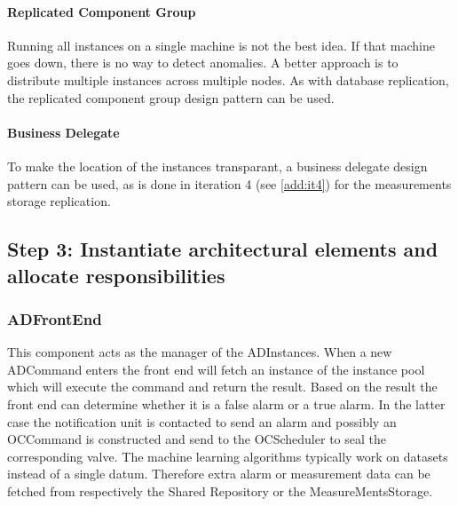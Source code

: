 \paragraph{Replicated Component Group}

\npar Running all instances on a single machine is not the best idea. If that
machine goes down, there is no way to detect anomalies. A better approach is to
distribute multiple instances across multiple nodes. As with database
replication, the replicated component group design pattern
\citep[see][p.~326]{Buschmann:07} can be used.

\paragraph{Business Delegate}

\npar To make the location of the instances transparant, a business delegate
design pattern \citep[see][p.~292]{Buschmann:07} can be used, as is done in
iteration 4 (see \ref{add:it4}) for the measurements storage replication.

\subsection{Step 3: Instantiate architectural elements and allocate responsibilities}
\label{add:it6/elements}


\subsubsection{ADFrontEnd}

\npar This component acts as the manager of the ADInstances. When a new
ADCommand enters the front end will fetch an instance of the instance pool which
will execute the command and return the result. Based on the result the front
end can determine whether it is a false alarm or a true alarm. In the latter
case the notification unit is contacted to send an alarm and possibly an
OCCommand is constructed and send to the OCScheduler to seal the corresponding
valve. The machine learning algorithms typically work on datasets instead of a
single datum. Therefore extra alarm or measurement data can be fetched from
respectively the Shared Repository or the MeasureMentsStorage.

